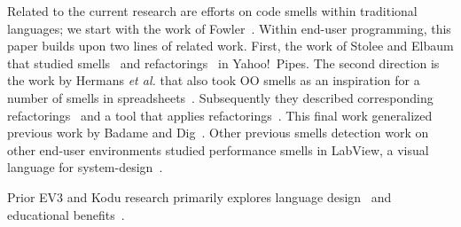 \documentclass[conference]{IEEEtran}
\begin{document}
\label{sec:related_work}
Related to the current research are efforts on code smells within traditional languages; we start with the work of Fowler~\cite{Fowl1999}. 
Within end-user programming, this paper builds upon two lines of related work. First, the work of Stolee and Elbaum that studied smells~\cite{StoleeTSE2013} and refactorings~\cite{Stolee2011} in Yahoo!\ Pipes. The second direction is the work by Hermans \emph{et al.} that also took OO smells as an inspiration for a number of smells in spreadsheets~\cite{Hermans2012intra, Hermans2012inter}. Subsequently they described corresponding refactorings~\cite{Hermans2012intraExt} and a tool that applies refactorings~\cite{hermans2014bumblebee}. This final work generalized previous work by Badame and Dig~\cite{badame2012refactoring}. Other previous smells detection work on other end-user environments  studied performance smells in LabView, a visual language for system-design~\cite{chambers2013smell, chambers2015impact}. 

Prior EV3 and Kodu research primarily explores 
language design~\cite{Fristoe:2011:SSE:2159365.2159396, Stolee:2011:ECS:1953163.1953197, MacLaurin:2009:KEP:1536513.1536516, MacLaurin:2011:DKT:1925844.1926413} 
and educational benefits~\cite{Fowler:2011:KGL:2159365.2159398, Touretzky:2013:AKC:2445196.2445374, Barnes:2002:TIJ:563340.563397, Hood:2005:TPL:1067445.1067454}. 
\end{document}
